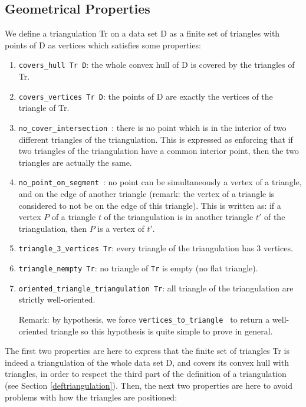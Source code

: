 \documentclass[a4paper,10pt]{article}
\def\ttt#1#2{{\tt{\color{black}#1} #2}}
\begin{document}
\subsection{Geometrical Properties}
\label{definition_triangulation}
We define a triangulation Tr on a data set D as a finite set of triangles with points of D as vertices which satisfies some properties:
\begin{enumerate}
\item \ttt{covers\_hull}{Tr D}: the whole convex hull of D is covered by the triangles of Tr.
\item \ttt{covers\_vertices}{Tr D}: the points of D are exactly the vertices of the triangle of Tr.
\item \ttt{no\_cover\_intersection}{}: there is no point which is in the interior of two different triangles of the triangulation. This is expressed as enforcing that if two triangles of the triangulation have a common interior point, then the two triangles are actually the same.
  \item\ttt{no\_point\_on\_segment}{}: no point can be simultaneously a vertex of a triangle, and on the edge of another triangle (remark: the vertex of a triangle is considered to not be on the edge of this triangle). This is written as: if a vertex $P$ of a triangle $t$ of the triangulation is in another triangle $t'$ of the triangulation, then $P$ is a vertex of $t'$.
\item \ttt{triangle\_3\_vertices}{Tr}: every triangle of the triangulation has 3 vertices.
\item \ttt{triangle\_nempty}{Tr}: no triangle of {\tt Tr} is empty (no flat triangle).
\item \ttt{oriented\_triangle\_triangulation}{Tr}: all triangle of the triangulation are strictly well-oriented.

  Remark: by hypothesis, we force \ttt{vertices\_to\_triangle}{} to return a well-oriented triangle so this hypothesis is quite simple to prove in general.
\end{enumerate}
The first two properties are here to express that the finite set of triangles Tr is indeed a triangulation of the whole data set D, and covers its convex hull with triangles, in order to respect the third part of the definition of a triangulation (see Section \ref{deftriangulation}).
Then, the next two properties are here to avoid problems with how the triangles are positioned: 
\end{document}
